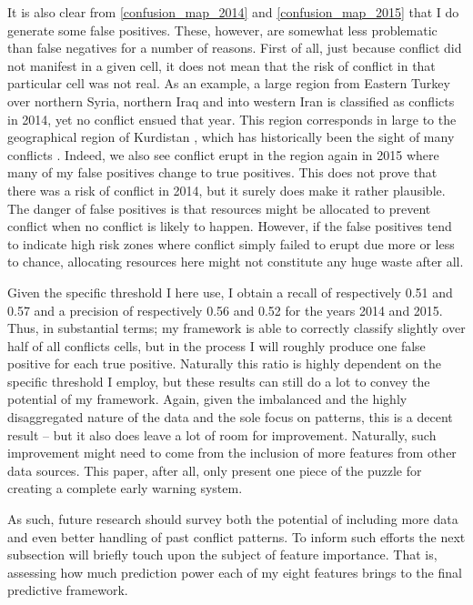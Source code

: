 \documentclass[a4paper]{article}
\begin{document}
It is also clear from \autoref{confusion_map_2014} and \autoref{confusion_map_2015} that I do generate some false positives. These, however, are somewhat less problematic than false negatives for a number of reasons. First of all, just because conflict did not manifest in a given cell, it does not mean that the risk of conflict in that particular cell was not real. As an example, a large region from Eastern Turkey over northern Syria, northern Iraq and into western Iran is classified as conflicts in 2014, yet no conflict ensued that year. This region corresponds in large to the geographical region of Kurdistan \citep[271-272]{DahlmanKurdistan}, which has historically been the sight of many conflicts \citep{DahlmanKurdistan}.  Indeed, we also see conflict erupt in the region again in 2015 where many of my false positives change to true positives. This does not prove that there was a risk of conflict in 2014, but it surely does make it rather plausible. The danger of false positives is that resources might be allocated to prevent conflict when no conflict is likely to happen. However, if the false positives tend to indicate high risk zones where conflict simply failed to erupt due more or less to chance, allocating resources here might not constitute any huge waste after all.\par

Given the specific threshold I here use, I obtain a recall of respectively 0.51 and 0.57 and a precision of respectively 0.56 and 0.52 for the years 2014 and 2015. Thus, in substantial terms; my framework is able to correctly classify slightly over half of all conflicts cells, but in the process I will roughly produce one false positive for each true positive. Naturally this ratio is highly dependent on the specific threshold I employ, but these results can still do a lot to convey the potential of my framework. Again, given the imbalanced and the highly disaggregated nature of the data and the sole focus on patterns, this is a decent result -- but it also does leave a lot of room for improvement. Naturally, such improvement might need to come from the inclusion of more features from other data sources. This paper, after all, only present one piece of the puzzle for creating a complete early warning system.\par

As such, future research should survey both the potential of including more data and even better handling of past conflict patterns. To inform such efforts the next subsection will briefly touch upon the subject of feature importance. That is, assessing how much prediction power each of my eight features brings to the final predictive framework.\par 
\end{document}
